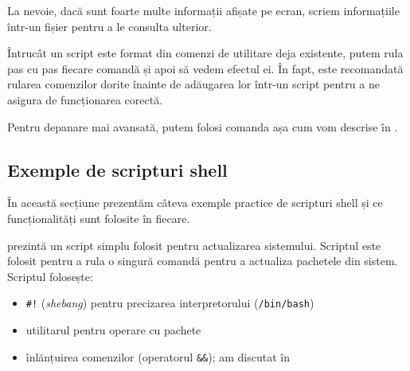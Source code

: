 La nevoie, dacă sunt foarte multe informații afișate pe ecran, scriem informațiile într-un fișier pentru a le consulta ulterior.

Întrucât un script este format din comenzi de utilitare deja existente, putem rula pas cu pas fiecare comandă și apoi să vedem efectul ei.
În fapt, este recomandată rularea comenzilor dorite înainte de adăugarea lor într-un script pentru a ne asigura de funcționarea corectă.

Pentru depanare mai avansată, putem folosi comanda  așa cum vom descrise în .

\subsection{Exemple de scripturi shell}
\label{sec:auto:dev:ex}

În această secțiune prezentăm câteva exemple practice de scripturi shell și ce funcționalități sunt folosite în fiecare.

 prezintă un script simplu folosit pentru actualizarea sistemului.
Scriptul este folosit pentru a rula o singură comandă pentru a actualiza pachetele din sistem.
Scriptul folosește:
\begin{itemize}
  \item \texttt{\#!} (\textit{shebang}) pentru precizarea interpretorului (\texttt{/bin/bash})
  \item utilitarul  pentru operare cu pachete
  \item înlănțuirea comenzilor (operatorul \texttt{\&\&}); am discutat în 
\end{itemize}


